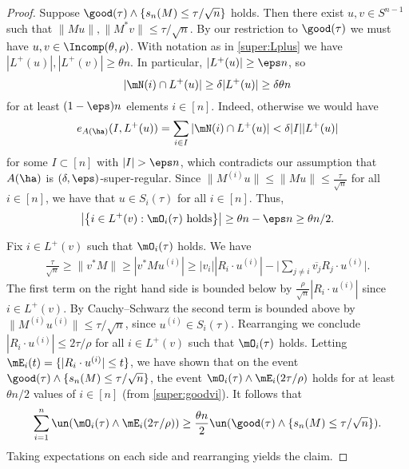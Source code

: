 \documentclass[aop,preprint]{imsart}
\theoremstyle{plain}
\theoremstyle{definition}
\theoremstyle{remark}
\numberwithin{equation}{section}
\numberwithin{theorem}{section}
\begin{document}
\begin{proof}
Suppose $\good(\tau)\wedge\{s_n(M)\le \tau/\sqrt{n}\}$ holds. 
Then there exist $u,v\in S^{n-1}$ such that $\|Mu\|, \|M^*v\|\le \tau/\sqrt{n}$.
By our restriction to $\good(\tau)$ we must have $u,v\in \Incomp(\theta,\rho)$.
With notation as in \eqref{super:Lplus} we have $|L^+(u)|, |L^+(v)|\ge \theta n$. 
In particular, $|L^+(u)|\ge \eps n$, so
\begin{equation}
|\mN(i) \cap L^+(u)| \ge \delta |L^+(u)| \ge \delta \theta n
\end{equation}
for at least $(1-\eps)n$ elements $i\in [n]$.
Indeed, otherwise we would have
\[
e_{A(\ha)}(I,L^+(u)) = \sum_{i\in I} |\mN(i)\cap L^+(u)| <\delta |I||L^+(u)|
\]
for some $I\subset[n]$ with $|I|>\eps n$, which contradicts our assumption that $A(\ha)$ is $(\delta,\eps)$-super-regular. 
Since 
$
\|M^{(i)}u\|\le \|Mu\|\le \frac{\tau}{\sqrt{n}}
$
for all $i\in [n]$, we have that $u\in S_i(\tau)$ for all $i\in [n]$. 
Thus, 
\begin{equation}	\label{super:goodvi}
\left| \big\{ i\in L^+(v): \mO_i(\tau) \mbox{ holds}\big\}\right| \ge \theta n -\eps n\ge \theta n/2.
\end{equation}

Fix $i\in L^+(v)$ such that $\mO_i(\tau)$ holds. 
We have
\begin{align*}
\frac{\tau}{\sqrt{n}} \ge \|v^*M\|\ge |v^*Mu^{(i)}| \ge |v_i| |R_i\cdot u^{(i)}| - \bigg|\sum_{j\ne i} \overline{v_j} R_j\cdot u^{(i)}\bigg|.
\end{align*}
The first term on the right hand side is bounded below by $\frac{\rho}{\sqrt{n}}|R_i\cdot u^{(i)}|$ since $i\in L^+(v)$.
By Cauchy--Schwarz the second term is bounded above by $\|M^{(i)} u^{(i)}\|\le \tau/\sqrt{n}$, since $u^{(i)}\in S_i(\tau)$.
Rearranging we conclude
$
|R_i\cdot u^{(i)}|\le 2\tau/\rho
$
for all $i\in L^+(v)$ such that $\mO_i(\tau)$ holds.
Letting $\mE_i(t)=\{|R_i\cdot u^{(i)}|\le t\}$,
we have shown that on the event $\good(\tau)\wedge\{s_n(M)\le \tau/\sqrt{n}\}$, the event
$\mO_i(\tau)\wedge \mE_i(2\tau/\rho)$ holds for at least $\theta n/2$ values of $i\in [n]$ (from \eqref{super:goodvi}). It follows that
\[
\sum_{i=1}^n \un(\mO_i(\tau)\wedge \mE_i(2\tau/\rho)) \ge \frac{\theta n}{2} \un(\good(\tau)\wedge\{s_n(M)\le \tau/\sqrt{n}\}).
\]
Taking expectations on each side and rearranging yields the claim.
%
\end{proof}
\end{document}
